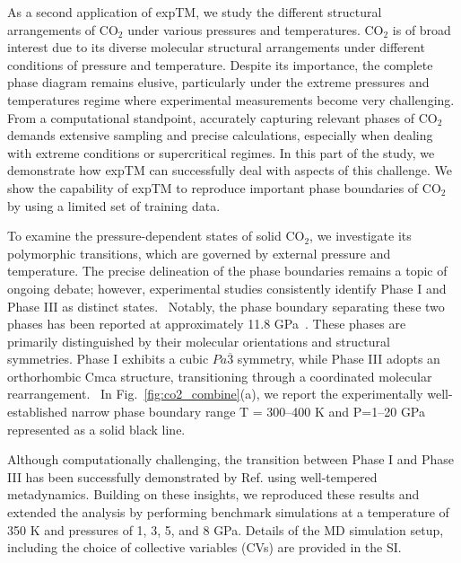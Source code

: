 \documentclass[aip,jcp,reprint,longbibliography]{revtex4-1}
\begin{document}
As a second application of expTM, we study the different structural arrangements of CO$_2$ under various pressures and temperatures. CO$_2$ is of broad interest due to its diverse molecular structural arrangements under different conditions of pressure and temperature.\cite{Ilaria2017CO2} 
Despite its importance, the complete phase diagram remains elusive, particularly under the extreme pressures and temperatures regime where experimental measurements become very challenging. From a computational standpoint, accurately capturing relevant phases of CO$_2$  demands extensive sampling and precise calculations, especially when dealing with extreme conditions or supercritical regimes.\cite{Ilaria2017CO2} In this part of the study, we demonstrate how expTM can successfully deal with aspects of this challenge. We show the capability of expTM to reproduce important phase boundaries of CO$_2$ by using a limited set of training data.

To examine the pressure-dependent states of solid CO$_2$, we investigate its polymorphic transitions, which are governed by external pressure and temperature. The precise delineation of the phase boundaries remains a topic of ongoing debate; however, experimental studies consistently identify Phase I and Phase III as distinct states.~\cite{datchi2009structure,iota2001phase,santoro2006high} Notably, the phase boundary separating these two phases has been reported at approximately 11.8 GPa~\cite{datchi2009structure}. These phases are primarily distinguished by their molecular orientations and structural symmetries. Phase I exhibits a cubic $Pa\overline{3}$ symmetry, while Phase III adopts an orthorhombic Cmca structure, transitioning through a coordinated molecular rearrangement.~\cite{santoro2006high,aoki1994crystal,bonev2003high}  In Fig.~\ref{fig:co2_combine}(a), we report the experimentally well-established narrow phase boundary range T = 300–400 K and P=1–20 GPa represented as a solid black line.\cite{datchi2009structure}


Although computationally challenging, the transition between Phase I and Phase III has been successfully demonstrated by Ref. using well-tempered metadynamics.\cite{Barducci2008well, Barducci2011metadynamics} Building on these insights, we reproduced these results and extended the analysis by performing benchmark simulations at a temperature of 350 K and pressures of 1, 3, 5, and 8 GPa. Details of the MD simulation setup, including the choice of collective variables (CVs) are provided in the SI. 
\end{document}
